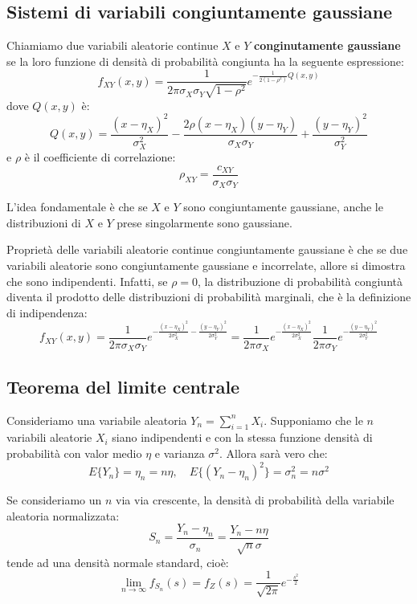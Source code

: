 \documentclass[a4paper,11pt]{article}
\begin{document}
\subsection{Sistemi di variabili congiuntamente gaussiane}
Chiamiamo due variabili aleatorie continue $X$ e $Y$ \textbf{conginutamente gaussiane} se la loro funzione di densità di probabilità congiunta ha la seguente espressione:
$$
f_{XY} (x, y) = \frac{1}{2 \pi \sigma_X \sigma_Y \sqrt{1 - \rho^2}} e^{- \frac{1}{2(1 - \rho^2)} Q(x, y)}
$$
dove $Q(x, y)$ è:
$$
Q(x, y) = \frac{(x - \eta_X)^2}{\sigma_X^2} - \frac{2 \rho(x - \eta_X)(y - \eta_Y)}{\sigma_X \sigma_Y} + \frac{(y - \eta_Y)^2}{\sigma_Y^2}
$$
e $\rho$ è il coefficiente di correlazione:
$$
\rho_{XY} = \frac{c_{XY}}{\sigma_X \sigma_Y}
$$

L'idea fondamentale è che se $X$ e $Y$ sono congiuntamente gaussiane, anche le distribuzioni di $X$ e $Y$ prese singolarmente sono gaussiane.

Proprietà delle variabili aleatorie continue congiuntamente gaussiane è che se due variabili aleatorie sono congiuntamente gaussiane e incorrelate, allore si dimostra che sono indipendenti. Infatti, se $\rho = 0$, la distribuzione di probabilità congiuntà diventa il prodotto delle distribuzioni di probabilità marginali, che è la definizione di indipendenza:
$$
f_{XY} (x, y) = \frac{1}{2 \pi \sigma_X \sigma_Y} e^{ -\frac{(x - \eta_X)^2}{2\sigma_X^2} -\frac{(y - \eta_Y)^2}{2\sigma_Y^2} }
= \frac{1}{2 \pi \sigma_X} e^{ -\frac{(x - \eta_X)^2}{2\sigma_X^2} } \frac{1}{2 \pi \sigma_Y} e^{ -\frac{(y - \eta_Y)^2}{2\sigma_Y^2} }
$$

\subsection{Teorema del limite centrale}
Consideriamo una variabile aleatoria $Y_n = \sum_{i = 1}^n X_i$. Supponiamo che le $n$ variabili aleatorie $X_i$ siano indipendenti e con la stessa funzione densità di probabilità con valor medio $\eta$ e varianza $\sigma^2$. Allora sarà vero che:
$$
E \{ Y_n \} = \eta_n = n \eta, \quad E\{ (Y_n - \eta_n)^2 \} = \sigma_n^2 = n \sigma^2
$$

Se consideriamo un $n$ via via crescente, la densità di probabilità della variabile aleatoria normalizzata:
$$
S_n = \frac{Y_n - \eta_n}{\sigma_n} = \frac{Y_n - n \eta}{\sqrt{n} \sigma}
$$
tende ad una densità normale standard, cioè:
$$
\lim_{n \rightarrow \infty} f_{S_n} (s) = f_Z(s) = \frac{1}{\sqrt{2\pi}} e^{-\frac{s^2}{2}}
$$
\end{document}

